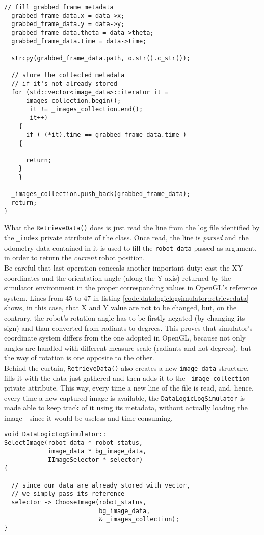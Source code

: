 \begin{lstlisting}[caption={\texttt{DataLogicLogSimulator::RetrieveData()} method},
    label={code:datalogiclogsimulator:retrievedata}]
  // fill grabbed frame metadata
  grabbed_frame_data.x = data->x;
  grabbed_frame_data.y = data->y;
  grabbed_frame_data.theta = data->theta;
  grabbed_frame_data.time = data->time;

  strcpy(grabbed_frame_data.path, o.str().c_str());

  // store the collected metadata 
  // if it's not already stored
  for (std::vector<image_data>::iterator it =
	 _images_collection.begin();
       it != _images_collection.end();
       it++)
    {
      if ( (*it).time == grabbed_frame_data.time )
	{

	  return;
	}
    }

  _images_collection.push_back(grabbed_frame_data);
  return;
}
\end{lstlisting}

What the \texttt{RetrieveData()} does is just read the line from the log 
file identified by the \texttt{\_index} private attribute of the class.
Once read, the line is \textit{parsed} and the odometry data contained 
in it is used to fill the \texttt{robot\_data} passed as argument, in 
order to return the \textit{current} robot position.
\\
Be careful that last operation conceals another important duty: cast the
XY coordinates and the orientation angle (along the Y axis) returned
by the simulator environment in the proper corresponding values in OpenGL's
reference system. Lines from 45 to 47 in listing
\ref{code:datalogiclogsimulator:retrievedata} shows, in this case,
that X and Y value are not to be changed, but, on the contrary, the robot's
rotation angle has to be firstly negated (by changing its sign) and
than converted from radiants to degrees. This proves that simulator's coordinate
system differs from the one adopted in OpenGL, because not only angles
are handled with different measure scale (radiants and not degrees), but the
way of rotation is one opposite to the other.
\\
Behind the curtain, \texttt{RetrieveData()} also creates a new 
\texttt{image\_data} structure, fills it with the data just 
gathered and then adds it to the \texttt{\_image\_collection} 
private attribute.
This way, every time a new line of the file is read, and, hence, 
every time a new captured image is available, the \texttt{DataLogicLogSimulator} 
is made able to keep track of it using its metadata, without actually 
loading the image - since it would be useless and time-consuming.
\\
\begin{lstlisting}[caption={\texttt{DataLogicLogSimulator::SelectImage()} method},
    label={code:datalogiclogsimulator:selectimage}]
void DataLogicLogSimulator::
SelectImage(robot_data * robot_status,
            image_data * bg_image_data,
            IImageSelector * selector)
{

  // since our data are already stored with vector,
  // we simply pass its reference
  selector -> ChooseImage(robot_status, 
                          bg_image_data, 
                          & _images_collection);
}
\end{lstlisting}

